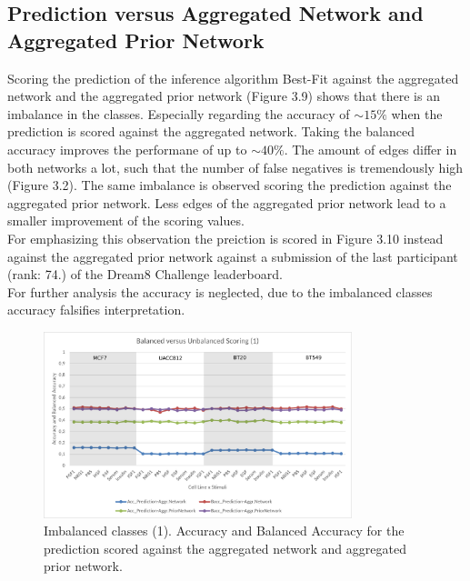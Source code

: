 \subsection*{Prediction versus Aggregated Network and Aggregated Prior Network}
Scoring the prediction of the inference algorithm Best-Fit against the aggregated network and the aggregated prior network (Figure 3.9) shows that there is an imbalance in the classes. Especially regarding the accuracy of $\sim 15\% $ when the prediction is scored against the aggregated network. Taking the balanced accuracy improves the performane of up to $\sim 40 \% $. The amount of edges differ in both networks a lot, such that the number of false negatives is tremendously high (Figure 3.2). The same imbalance is observed scoring the prediction against the aggregated prior network. Less edges of the aggregated prior network lead to a smaller improvement of the scoring values.\\
For emphasizing this observation the preiction is scored in Figure 3.10 instead against the aggregated prior network against a submission of the last participant (rank: 74.) of the Dream8 Challenge leaderboard.\\
For further analysis the accuracy is neglected, due to the imbalanced classes accuracy falsifies interpretation.
\begin{figure}[H]
\captionsetup{width=0.8\linewidth}
\centering
\includegraphics[width=0.8\textwidth]{./Bilder/Scoring/dreamchallenge/1_Balanced_vs_Unbalanced/balanced1.pdf}
\caption[Imbalanced classes (1)]{Imbalanced classes (1). Accuracy and Balanced Accuracy for the prediction scored against the aggregated network and aggregated prior network.}
\label{fig:10}
\end{figure}
 


